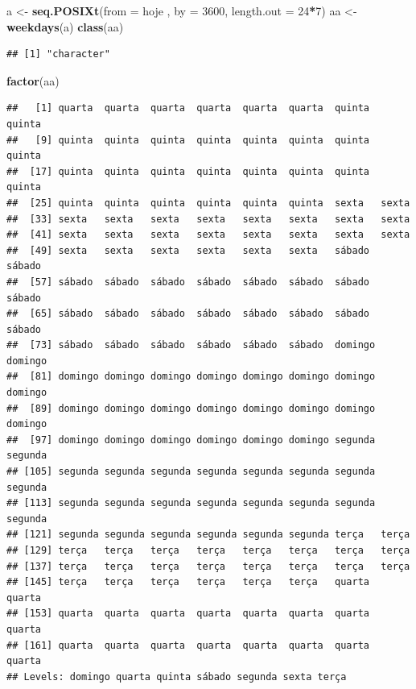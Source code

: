 \documentclass[]{book}
\newenvironment{Shaded}{\begin{snugshade}}{\end{snugshade}}
\newcommand{\KeywordTok}[1]{\textcolor[rgb]{0.13,0.29,0.53}{\textbf{#1}}}
\newcommand{\DataTypeTok}[1]{\textcolor[rgb]{0.13,0.29,0.53}{#1}}
\newcommand{\DecValTok}[1]{\textcolor[rgb]{0.00,0.00,0.81}{#1}}
\newcommand{\StringTok}[1]{\textcolor[rgb]{0.31,0.60,0.02}{#1}}
\newcommand{\OperatorTok}[1]{\textcolor[rgb]{0.81,0.36,0.00}{\textbf{#1}}}
\newcommand{\NormalTok}[1]{#1}
\theoremstyle{definition}
\theoremstyle{definition}
\theoremstyle{definition}
\theoremstyle{remark}
\begin{document}
\begin{Shaded}
\begin{Highlighting}[]
\NormalTok{a <-}\StringTok{ }\KeywordTok{seq.POSIXt}\NormalTok{(}\DataTypeTok{from =}\NormalTok{ hoje , }\DataTypeTok{by =} \DecValTok{3600}\NormalTok{, }\DataTypeTok{length.out =} \DecValTok{24}\OperatorTok{*}\DecValTok{7}\NormalTok{)}
\NormalTok{aa <-}\StringTok{ }\KeywordTok{weekdays}\NormalTok{(a)}
\KeywordTok{class}\NormalTok{(aa)}
\end{Highlighting}
\end{Shaded}

\begin{verbatim}
## [1] "character"
\end{verbatim}

\begin{Shaded}
\begin{Highlighting}[]
\KeywordTok{factor}\NormalTok{(aa)}
\end{Highlighting}
\end{Shaded}

\begin{verbatim}
##   [1] quarta  quarta  quarta  quarta  quarta  quarta  quinta  quinta 
##   [9] quinta  quinta  quinta  quinta  quinta  quinta  quinta  quinta 
##  [17] quinta  quinta  quinta  quinta  quinta  quinta  quinta  quinta 
##  [25] quinta  quinta  quinta  quinta  quinta  quinta  sexta   sexta  
##  [33] sexta   sexta   sexta   sexta   sexta   sexta   sexta   sexta  
##  [41] sexta   sexta   sexta   sexta   sexta   sexta   sexta   sexta  
##  [49] sexta   sexta   sexta   sexta   sexta   sexta   sábado  sábado 
##  [57] sábado  sábado  sábado  sábado  sábado  sábado  sábado  sábado 
##  [65] sábado  sábado  sábado  sábado  sábado  sábado  sábado  sábado 
##  [73] sábado  sábado  sábado  sábado  sábado  sábado  domingo domingo
##  [81] domingo domingo domingo domingo domingo domingo domingo domingo
##  [89] domingo domingo domingo domingo domingo domingo domingo domingo
##  [97] domingo domingo domingo domingo domingo domingo segunda segunda
## [105] segunda segunda segunda segunda segunda segunda segunda segunda
## [113] segunda segunda segunda segunda segunda segunda segunda segunda
## [121] segunda segunda segunda segunda segunda segunda terça   terça  
## [129] terça   terça   terça   terça   terça   terça   terça   terça  
## [137] terça   terça   terça   terça   terça   terça   terça   terça  
## [145] terça   terça   terça   terça   terça   terça   quarta  quarta 
## [153] quarta  quarta  quarta  quarta  quarta  quarta  quarta  quarta 
## [161] quarta  quarta  quarta  quarta  quarta  quarta  quarta  quarta 
## Levels: domingo quarta quinta sábado segunda sexta terça
\end{verbatim}
\end{document}
